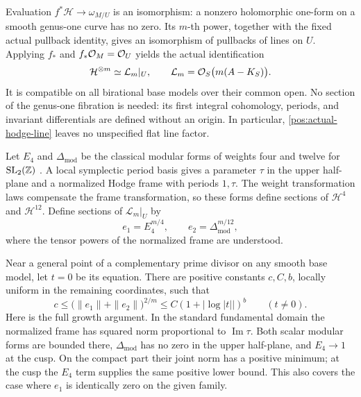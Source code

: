 Evaluation \(f^*\mathcal H\to\omega_{M/U}\) is an isomorphism:
a nonzero holomorphic one-form on a smooth genus-one curve has no zero.
Its \(m\)-th power, together with the fixed actual pullback identity,
gives an isomorphism of pullbacks of lines on \(U\). Applying
\(f_*\) and \(f_*\mathcal{O}_M=\mathcal{O}_U\) yields the actual identification
\begin{equation}\label{pos:actual-hodge-line}
 \mathcal H^{\otimes m}\simeq\mathcal L_m|_U,
 \qquad\mathcal L_m=\mathcal{O}_S\bigl(m(A-K_S)\bigr).
\end{equation}
It is compatible on all birational base models over their common
open. No section of the genus-one fibration is needed: its first
integral cohomology, periods, and invariant differentials are defined
without an origin. In particular, \eqref{pos:actual-hodge-line}
leaves no unspecified flat line factor.

Let \(E_4\) and \(\Delta_{\mathrm{mod}}\) be the classical modular
forms of weights four and twelve for \(\mathrm{SL}_2(\mathbb{Z})\)
\cite[Chapter~VII]{SerreArithmetic}. A local symplectic period basis
gives a parameter \(\tau\) in the upper half-plane and a normalized
Hodge frame with periods \(1,\tau\). The weight transformation laws
compensate the frame transformation, so these forms define sections
of \(\mathcal H^4\) and \(\mathcal H^{12}\). Define sections of
\(\mathcal L_m|_U\) by
\begin{equation}\label{pos:modular-sections}
 e_1=E_4^{m/4},\qquad e_2=\Delta_{\mathrm{mod}}^{m/12},
\end{equation}
where the tensor powers of the normalized frame are understood.

Near a general point of a complementary prime divisor on any smooth
base model, let \(t=0\) be its equation. There are positive constants
\(c,C,b\), locally uniform in the remaining coordinates, such that
\begin{equation}\label{pos:modular-growth}
 c\leq\bigl(\|e_1\|+\|e_2\|\bigr)^{2/m}
 \leq C(1+|\log|t||)^b\qquad(t\ne0).
\end{equation}
Here is the full growth argument. In the standard fundamental domain
the normalized frame has squared norm proportional to
\(\operatorname{Im}\tau\). Both scalar modular forms are bounded
there, \(\Delta_{\mathrm{mod}}\) has no zero in the upper half-plane,
and \(E_4\to1\) at the cusp. On the compact part their joint norm has
a positive minimum; at the cusp the \(E_4\) term supplies the same
positive lower bound. This also covers the case where \(e_1\) is
identically zero on the given family.

